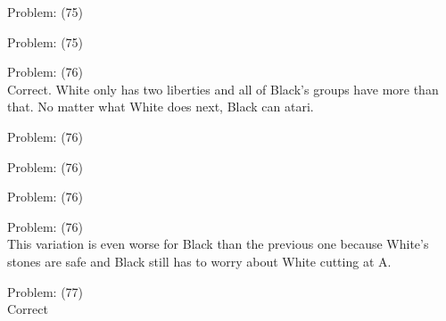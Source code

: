 \documentclass[11pt]{article}
\begin{document}
\begin{minipage}[t]{0.5\textwidth}
  {\centering
  
Problem: (75)\\
  }
\end{minipage}
\begin{minipage}[t]{0.5\textwidth}
  {\centering
  
Problem: (75)\\
  }
\end{minipage}
\begin{minipage}[t]{0.5\textwidth}
  {\centering
  
Problem: (76)\\
Correct. White only has two liberties and all of Black's groups have more than that. No matter what White does next, Black can atari.\\
  }
\end{minipage}
\begin{minipage}[t]{0.5\textwidth}
  {\centering
  
Problem: (76)\\
  }
\end{minipage}
\begin{minipage}[t]{0.5\textwidth}
  {\centering
  
Problem: (76)\\
  }
\end{minipage}
\begin{minipage}[t]{0.5\textwidth}
  {\centering
  
Problem: (76)\\
  }
\end{minipage}
\begin{minipage}[t]{0.5\textwidth}
  {\centering
  
Problem: (76)\\
This variation is even worse for Black than the previous one because White's stones are safe and Black still has to worry about White cutting at A.\\
  }
\end{minipage}
\begin{minipage}[t]{0.5\textwidth}
  {\centering
  
Problem: (77)\\
Correct\\
  }
\end{minipage}
\end{document}
